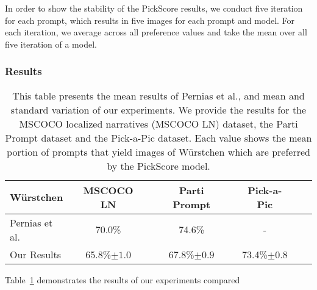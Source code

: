 In order to show the stability of the PickScore results, we conduct five
iteration for each prompt, which results in five images for each prompt and
model. For each iteration, we average across all preference values and take the
mean over all five iteration of a model.

\subsubsection{Results}
\begin{table}[t]
    \caption{This table presents the mean results of Pernias et
        al.\cite{pernias2024wrstchen}, and mean and standard variation of our
        experiments. We provide the results for the MSCOCO localized narratives
        (MSCOCO LN) dataset, the Parti Prompt dataset and the Pick-a-Pic
        dataset. Each value shows the mean portion of prompts that yield images
        of W\"urstchen which are preferred by the PickScore model.}
    \label{tab:wuerstchen:results}
    \centering
    \begin{tabular}{lccccccc}
        \toprule
        \textbf{W\"urstchen}                     & \textbf{MSCOCO LN}    & \phantom{0} & \textbf{Parti Prompt} & \phantom{0} & \textbf{Pick-a-Pic}   \\
        \midrule
        Pernias et al.\cite{pernias2024wrstchen} & 70.0\%                & \phantom{0} & 74.6\%                & \phantom{0} & -                     \\
        Our Results                              & 65.8\%{\tiny$\pm1.0$} & \phantom{0} & 67.8\%{\tiny$\pm0.9$} & \phantom{0} & 73.4\%{\tiny$\pm0.8$} \\
        \bottomrule
    \end{tabular}
\end{table}
Table~\ref{tab:wuerstchen:results} demonstrates the results of our experiments compared